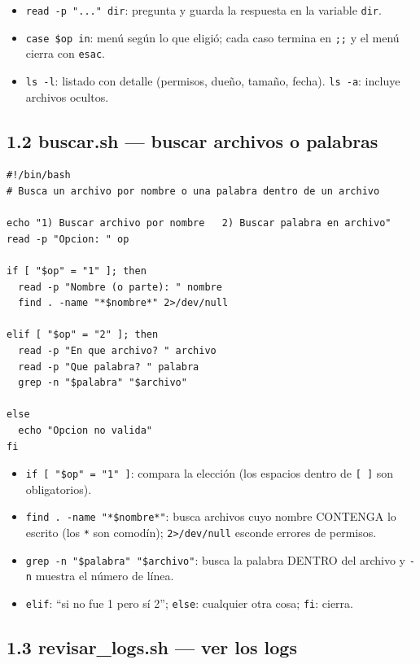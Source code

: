 \begin{itemize}
  \item \texttt{read -p "..." dir}: pregunta y guarda la respuesta en la variable \texttt{dir}.
  \item \texttt{case \$op in}: menú según lo que eligió; cada caso termina en \texttt{;;} y el menú cierra con \texttt{esac}.
  \item \texttt{ls -l}: listado con detalle (permisos, dueño, tamaño, fecha). \texttt{ls -a}: incluye archivos ocultos.
\end{itemize}

\subsection{1.2 buscar.sh --- buscar archivos o palabras}

\begin{lstlisting}
#!/bin/bash
# Busca un archivo por nombre o una palabra dentro de un archivo

echo "1) Buscar archivo por nombre   2) Buscar palabra en archivo"
read -p "Opcion: " op

if [ "$op" = "1" ]; then
  read -p "Nombre (o parte): " nombre
  find . -name "*$nombre*" 2>/dev/null

elif [ "$op" = "2" ]; then
  read -p "En que archivo? " archivo
  read -p "Que palabra? " palabra
  grep -n "$palabra" "$archivo"

else
  echo "Opcion no valida"
fi
\end{lstlisting}

\begin{itemize}
  \item \texttt{if [ "\$op" = "1" ]}: compara la elección (los espacios dentro de \texttt{[ ]} son obligatorios).
  \item \texttt{find . -name "*\$nombre*"}: busca archivos cuyo nombre CONTENGA lo escrito (los \texttt{*} son comodín); \texttt{2>/dev/null} esconde errores de permisos.
  \item \texttt{grep -n "\$palabra" "\$archivo"}: busca la palabra DENTRO del archivo y \texttt{-n} muestra el número de línea.
  \item \texttt{elif}: ``si no fue 1 pero sí 2''; \texttt{else}: cualquier otra cosa; \texttt{fi}: cierra.
\end{itemize}

\subsection{1.3 revisar\_logs.sh --- ver los logs}

